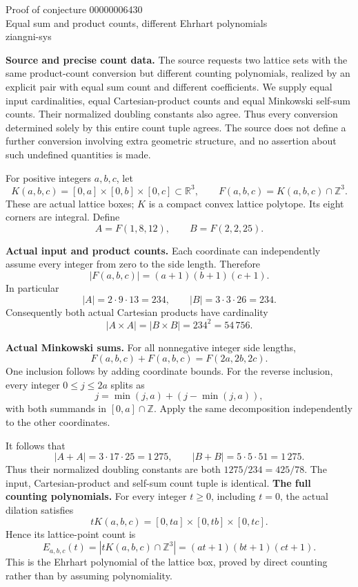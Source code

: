 \documentclass[11pt]{article}
\begin{document}
\begin{center}
{\Large Proof of conjecture 00000006430}\\[5pt]
Equal sum and product counts, different Ehrhart polynomials\\
ziangni-sys
\end{center}
\textbf{Source and precise count data.}
The source requests two lattice sets with the same product-count conversion but different counting polynomials, realized by an explicit pair with equal sum count and different coefficients. We supply equal input cardinalities, equal Cartesian-product counts and equal Minkowski self-sum counts. Their normalized doubling constants also agree. Thus every conversion determined solely by this entire count tuple agrees. The source does not define a further conversion involving extra geometric structure, and no assertion about such undefined quantities is made.

For positive integers $a,b,c$, let
\[
 K(a,b,c)=[0,a]\times[0,b]\times[0,c]\subset\mathbb R^3,
 \qquad F(a,b,c)=K(a,b,c)\cap\mathbb Z^3.
\]
These are actual lattice boxes; $K$ is a compact convex lattice polytope. Its eight corners are integral. Define
\[
 A=F(1,8,12),\qquad B=F(2,2,25).
\]

\textbf{Actual input and product counts.}
Each coordinate can independently assume every integer from zero to the side length. Therefore
\[
 |F(a,b,c)|=(a+1)(b+1)(c+1).
\]
In particular
\[
 |A|=2\cdot9\cdot13=234,\qquad
 |B|=3\cdot3\cdot26=234.
\]
Consequently both actual Cartesian products have cardinality
\[
 |A\times A|=|B\times B|=234^2=54\,756.
\]

\textbf{Actual Minkowski sums.}
For all nonnegative integer side lengths,
\[
 F(a,b,c)+F(a,b,c)=F(2a,2b,2c).
\]
One inclusion follows by adding coordinate bounds. For the reverse inclusion, every integer $0\le j\le2a$ splits as
\[
 j=\min(j,a)+(j-\min(j,a)),
\]
with both summands in $[0,a]\cap\mathbb Z$. Apply the same decomposition independently to the other coordinates.

It follows that
\[
 |A+A|=3\cdot17\cdot25=1\,275,\qquad
 |B+B|=5\cdot5\cdot51=1\,275.
\]
Thus their normalized doubling constants are both $1275/234=425/78$. The input, Cartesian-product and self-sum count tuple is identical.
\newpage
\textbf{The full counting polynomials.}
For every integer $t\ge0$, including $t=0$, the actual dilation satisfies
\[
 tK(a,b,c)=[0,ta]\times[0,tb]\times[0,tc].
\]
Hence its lattice-point count is
\[
 E_{a,b,c}(t)=|tK(a,b,c)\cap\mathbb Z^3|
            =(at+1)(bt+1)(ct+1).
\]
This is the Ehrhart polynomial of the lattice box, proved by direct counting rather than by assuming polynomiality.
\end{document}
